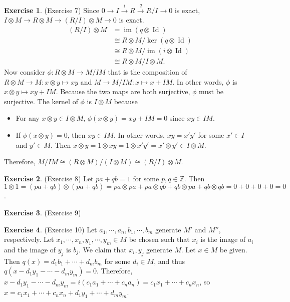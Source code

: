 \documentclass[12pt, psamsfonts]{amsart}
\theoremstyle{definition}
\newtheorem*{exer}{Exercise}
\theoremstyle{remark}
\DeclareMathOperator{\Id}{Id}
\DeclareMathOperator{\im}{im}
\numberwithin{equation}{section}
\begin{document}
\begin{exer}{(Exercise 7)}
  Since $0 \rightarrow I \xrightarrow{i} R \xrightarrow{q} R / I \rightarrow 0$ is exact, $I \otimes M \rightarrow R \otimes M \rightarrow (R / I) \otimes M \rightarrow 0$ is exact.
  \begin{align*}
    (R / I) \otimes M
      &= \im(q \otimes \Id) \\
      &\cong R \otimes M / \ker(q \otimes \Id) \\
      &\cong R \otimes M / \im(i \otimes \Id) \\
      &\cong R \otimes M / I \otimes M.
  \end{align*}
  Now consider $\phi: R \otimes M \rightarrow M / IM$ that is the composition of $R \otimes M \rightarrow M: x \otimes y \mapsto xy$ and $M \rightarrow M / IM: x \mapsto x + IM$.
  In other words, $\phi$ is $x \otimes y \mapsto xy + IM$.
  Because the two maps are both surjective, $\phi$ must be surjective.
  The kernel of $\phi$ is $I \otimes M$ because
  \begin{itemize}
    \item
      For any $x \otimes y \in I \otimes M$, $\phi(x \otimes y) = xy + IM = 0$ since $xy \in IM$.
    \item
      If $\phi(x \otimes y) = 0$, then $xy \in IM$.
      In other words, $xy = x'y'$ for some $x' \in I$ and $y' \in M$.
      Then $x \otimes y = 1 \otimes xy = 1 \otimes x'y' = x' \otimes y' \in I \otimes M$.
  \end{itemize}
  Therefore, $M / IM \cong (R \otimes M) / (I \otimes M) \cong (R / I) \otimes M$.
\end{exer}

\begin{exer}{(Exercise 8)}
  Let $pa + qb = 1$ for some $p, q \in \mathbb{Z}$.
  Then $1 \otimes 1 = (pa + qb) \otimes (pa + qb) = pa \otimes pa + pa \otimes qb + qb \otimes pa + qb \otimes qb = 0 + 0 + 0 + 0 = 0$.
\end{exer}

\begin{exer}{(Exercise 9)}
\end{exer}

\begin{exer}{(Exercise 10)}
  Let $a_1, \cdots, a_n, b_1, \cdots, b_m$ generate $M'$ and $M''$, respectively.
  Let $x_1, \cdots, x_n, y_1, \cdots, y_m \in M$ be chosen such that $x_i$ is the image of $a_i$ and the image of $y_j$ is $b_j$.
  We claim that $x_i, y_j$ generate $M$.
  Let $x \in M$ be given.
  Then $q(x) = d_1b_1 + \cdots + d_mb_m$ for some $d_i \in M$, and thus $q(x - d_1y_1 - \cdots - d_my_m) = 0$.
  Therefore, $x - d_1y_1 - \cdots - d_my_m = i(c_1a_1 + \cdots + c_na_n) = c_1x_1 + \cdots + c_nx_n$, so $x = c_1x_1 + \cdots + c_nx_n + d_1y_1 + \cdots + d_my_m$.
\end{exer}
\end{document}
